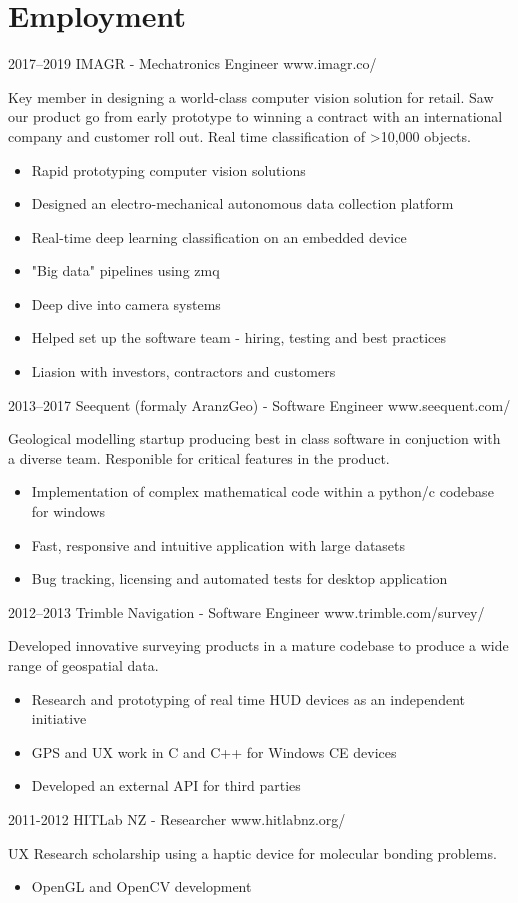 \documentclass[print]{friggeri-cv} %
\begin{document}
\section{Employment}
\begin{entrylist}
\entry
{2017--2019}
{IMAGR - Mechatronics Engineer}
{www.imagr.co/}
{Key member in designing a world-class computer vision solution for retail. Saw our product go from early prototype to winning a contract with an international company and customer roll out. Real time classification of >10,000 objects.
\begin{itemize}
\item Rapid prototyping computer vision solutions
\item Designed an electro-mechanical autonomous data collection platform
\item Real-time deep learning classification on an embedded device
\item "Big data" pipelines using zmq
\item Deep dive into camera systems
\item Helped set up the software team - hiring, testing and best practices
\item Liasion with investors, contractors and customers
\end{itemize}}

\entry
{2013--2017}
{Seequent (formaly AranzGeo) - Software Engineer}
{www.seequent.com/}
{Geological modelling startup producing best in class software in conjuction with a diverse team. Responible for critical features in the product.
\begin{itemize}
\item Implementation of complex mathematical code within a python/c codebase for windows
\item Fast, responsive and intuitive application with large datasets
\item Bug tracking, licensing and automated tests for desktop application
\end{itemize}}

\entry
{2012--2013}
{Trimble Navigation - Software Engineer}
{www.trimble.com/survey/}
{Developed innovative surveying products in a mature codebase to produce a wide range of geospatial data.
\begin{itemize}
\item Research and prototyping of real time HUD devices as an independent initiative
\item GPS and UX work in C and C++ for Windows CE devices
\item Developed an external API for third parties
\end{itemize}}

\entry
{2011-2012}
{HITLab NZ - Researcher}
{www.hitlabnz.org/}
{UX Research scholarship using a haptic device for molecular bonding problems.
\begin{itemize}
\item OpenGL and OpenCV development
\end{itemize}}
\end{entrylist}\\ 
\end{document}
